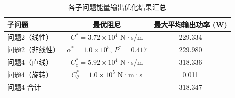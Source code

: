 \begin{table}[H]
\centering
\caption{各子问题能量输出优化结果汇总}
\label{tab:opt_summary}
\begin{tabular}{lcc}
\toprule
子问题 & 最优阻尼 & 最大平均输出功率 (W) \\
\midrule
问题2（线性） & $C^*=3.72\times10^4$ N·s/m & 229.334 \\
问题2（非线性） & $\alpha^*=1.0\times10^5$, $P^*=0.417$ & 229.980 \\
问题4（直线） & $C_z^*=5.92\times10^4$ N·s/m & 318.336 \\
问题4（旋转） & $C_\theta^*=1.0\times10^5$ N·m·s & 0.011 \\
\midrule
问题4 合计 & — & 318.347 \\
\bottomrule
\end{tabular}
\end{table}
